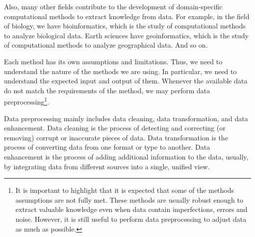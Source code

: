 Also, many other fields contribute to the development of domain-specific computational
methods to extract knowledge from data.  For example, in the field of biology, we have
bioinformatics, which is the study of computational methods to analyze biological data.
Earth sciences have geoinformatics, which is the study of computational methods to
analyze geographical data.  And so on.

Each method has its own assumptions and limitations.  Thus, we need to understand the
nature of the methods we are using.  In particular, we need to understand the
expected input and output of them.  Whenever the available data do not match the
requirements of the method, we may perform data preprocessing\footnote{%
  It is important to highlight that it is expected that some of the methods assumptions
  are not fully met.  These methods are usually robust enough to extract valuable
  knowledge even when data contain imperfections, errors and noise.  However, it is still
  useful to perform data preprocessing to adjust data as much as possible.%
}.

Data preprocessing mainly includes data cleaning, data transformation, and data
enhancement. Data cleaning is the process of detecting and correcting (or removing)
corrupt or inaccurate pieces of data.  Data transformation is the process of converting
data from one format or type to another.  Data enhancement is the process of adding
additional information to the data, usually, by integrating
data from different sources into a single, unified view.

